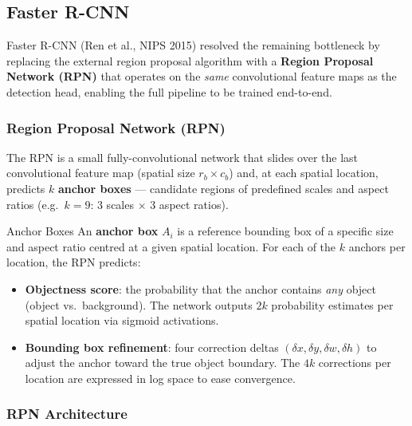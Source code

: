 \documentclass[11pt,a4paper]{article}
\newcommand{\term}[1]{\textcolor{DefGreen}{\textbf{#1}}}
\begin{document}
\subsection{Faster R-CNN}
\label{sec:faster_rcnn}

Faster R-CNN (Ren et al., NIPS 2015) resolved the remaining bottleneck by replacing the external region proposal algorithm with a \term{Region Proposal Network (RPN)} that operates on the \emph{same} convolutional feature maps as the detection head, enabling the full pipeline to be trained end-to-end.

\subsubsection{Region Proposal Network (RPN)}

The RPN is a small fully-convolutional network that slides over the last convolutional feature map (spatial size $r_b \times c_b$) and, at each spatial location, predicts $k$ \term{anchor boxes} — candidate regions of predefined scales and aspect ratios (e.g.\ $k = 9$: 3 scales $\times$ 3 aspect ratios).

\begin{defbox}{Anchor Boxes}
An \textbf{anchor box} $A_i$ is a reference bounding box of a specific size and aspect ratio centred at a given spatial location. For each of the $k$ anchors per location, the RPN predicts:
\begin{itemize}
  \item \textbf{Objectness score}: the probability that the anchor contains \emph{any} object (object vs.\ background). The network outputs $2k$ probability estimates per spatial location via sigmoid activations.
  \item \textbf{Bounding box refinement}: four correction deltas $(\delta x, \delta y, \delta w, \delta h)$ to adjust the anchor toward the true object boundary. The $4k$ corrections per location are expressed in log space to ease convergence.
\end{itemize}
\end{defbox}

\subsubsection{RPN Architecture}
\end{document}
